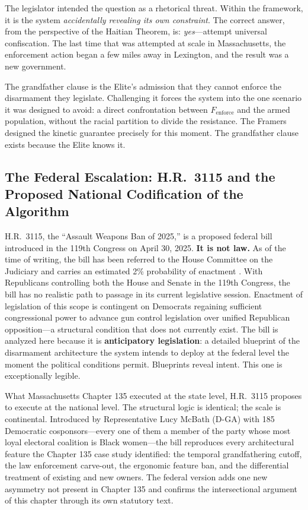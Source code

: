 The legislator intended the question as a rhetorical threat. Within the framework, it is the system \textit{accidentally revealing its own constraint}. The correct answer, from the perspective of the Haitian Theorem, is: \textit{yes}---attempt universal confiscation. The last time that was attempted at scale in Massachusetts, the enforcement action began a few miles away in Lexington, and the result was a new government.

The grandfather clause is the Elite's admission that they cannot enforce the disarmament they legislate. Challenging it forces the system into the one scenario it was designed to avoid: a direct confrontation between $F_{\text{enforce}}$ and the armed population, without the racial partition to divide the resistance. The Framers designed the kinetic guarantee precisely for this moment. The grandfather clause exists because the Elite knows it.

\subsection{The Federal Escalation: H.R.\ 3115 and the Proposed National Codification of the Algorithm}
\label{subsec:hr3115_federal}

\begin{keyinsight}
H.R.\ 3115, the ``Assault Weapons Ban of 2025,'' is a proposed federal bill introduced in the 119th Congress on April 30, 2025. \textbf{It is not law.} As of the time of writing, the bill has been referred to the House Committee on the Judiciary and carries an estimated 2\% probability of enactment \cite{hr3115_awb_2025}. With Republicans controlling both the House and Senate in the 119th Congress, the bill has no realistic path to passage in its current legislative session. Enactment of legislation of this scope is contingent on Democrats regaining sufficient congressional power to advance gun control legislation over unified Republican opposition---a structural condition that does not currently exist. The bill is analyzed here because it is \textbf{anticipatory legislation}: a detailed blueprint of the disarmament architecture the system intends to deploy at the federal level the moment the political conditions permit. Blueprints reveal intent. This one is exceptionally legible.
\end{keyinsight}

What Massachusetts Chapter 135 executed at the state level, H.R.\ 3115 proposes to execute at the national level. The structural logic is identical; the scale is continental. Introduced by Representative Lucy McBath (D-GA) with 185 Democratic cosponsors---every one of them a member of the party whose most loyal electoral coalition is Black women---the bill reproduces every architectural feature the Chapter 135 case study identified: the temporal grandfathering cutoff, the law enforcement carve-out, the ergonomic feature ban, and the differential treatment of existing and new owners. The federal version adds one new asymmetry not present in Chapter 135 and confirms the intersectional argument of this chapter through its own statutory text.


